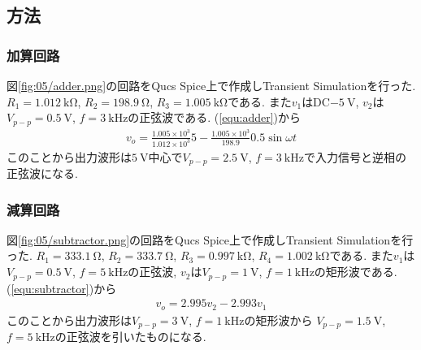 \subsection{方法}
\subsubsection{加算回路}
図\ref{fig:05/adder.png}の回路をQucs Spice上で作成しTransient Simulationを行った.
$R_1=1.012\ \si{\kilo\ohm}$, $R_2=198.9\ \si{\ohm}$, $R_3=1.005\ \si{\kilo\ohm}$である.
また$v_1$はDC$-5\ \si{\volt}$, $v_2$は$V_{p-p}=0.5\ \si{\volt}$, $f=3\ \si{\kilo\hertz}$の正弦波である.
(\ref{equ:adder})から
\begin{align}
  v_o=\frac{1.005\times10^3}{1.012\times10^3}5-\frac{1.005\times10^3}{198.9}0.5\sin\omega t
\end{align}
このことから出力波形は$5\ \si{\volt}$中心で$V_{p-p}=2.5\ \si{\volt}$, $f=3\ \si{\kilo\hertz}$で入力信号と逆相の正弦波になる.
\subsubsection{減算回路}
図\ref{fig:05/subtractor.png}の回路をQucs Spice上で作成しTransient Simulationを行った.
$R_1=333.1\ \si{\ohm}$, $R_2=333.7\ \si{\ohm}$, $R_3=0.997\ \si{\kilo\ohm}$, $R_4=1.002\ \si{\kilo\ohm}$である.
また$v_1$は$V_{p-p}=0.5\ \si{\volt}$, $f=5\ \si{\kilo\hertz}$の正弦波, $v_2$は$V_{p-p}=1\ \si{\volt}$, $f=1\ \si{\kilo\hertz}$の矩形波である.
(\ref{equ:subtractor})から
\begin{align}
  v_o=2.995v_2-2.993v_1
\end{align}
このことから出力波形は$V_{p-p}=3\ \si{\volt}$, $f=1\ \si{\kilo\hertz}$の矩形波から
$V_{p-p}=1.5\ \si{\volt}$, $f=5\ \si{\kilo\hertz}$の正弦波を引いたものになる.